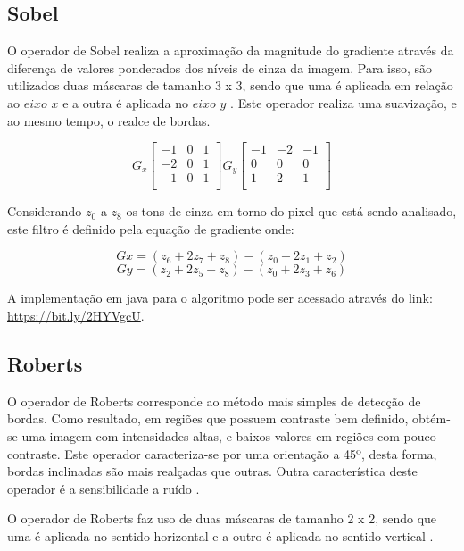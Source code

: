 \documentclass[
	12pt,				%
	oneside,			%
	a4paper,			%
	english,			%
	french,				%
	spanish,			%
	brazil,				%
	]{abntex2}
\begin{document}
\subsection{Sobel}

O operador de Sobel realiza a aproximação da magnitude do gradiente através da diferença de valores ponderados dos níveis de cinza da imagem. Para isso, são utilizados duas máscaras de tamanho 3 x 3, sendo que uma é aplicada em relação ao \(eixo\) \(x\) e a outra é aplicada no \(eixo\) \(y\) \cite{pedriniSchwartz:2008}. Este operador realiza uma suavização, e ao mesmo tempo, o realce de bordas.

\[
G_x
\begin{bmatrix}
    -1 & 0 & 1   \\ 
	-2 & 0 & 1   \\ 
	-1 & 0 & 1   \\ 
\end{bmatrix} 
G_y
\begin{bmatrix}
    -1 & -2 & -1   \\ 
	 0 &  0 & 0    \\ 
	 1 &  2 & 1    \\    
\end{bmatrix} 
\]

Considerando \(z_0\) a \(z_8\) os tons de cinza em torno do pixel que está sendo analisado, este filtro é definido pela equação de gradiente onde:

\[Gx = (z_6 + 2z_7 + z_8) - (z_0 + 2z_1 + z_2)\]
\[Gy = (z_2 + 2z_5 + z_8) - (z_0 + 2z_3 + z_6)\]

A implementação em java para o algoritmo pode ser acessado através do link: \url{https://bit.ly/2HYVgcU}.

\subsection{Roberts}
O operador de Roberts corresponde ao método mais simples de detecção de bordas. Como resultado, em regiões que possuem contraste bem definido, obtém-se uma imagem com intensidades altas, e baixos valores em regiões com pouco contraste. Este operador caracteriza-se por uma orientação a 45º, desta forma, bordas inclinadas são mais realçadas que outras. Outra característica deste operador é a sensibilidade a ruído \cite{conciAzevedoLeta:2008}.

O operador de Roberts faz uso de duas máscaras de tamanho 2 x 2, sendo que uma é aplicada no sentido horizontal e a outro é aplicada no sentido vertical \cite{pedriniSchwartz:2008}.
\end{document}
